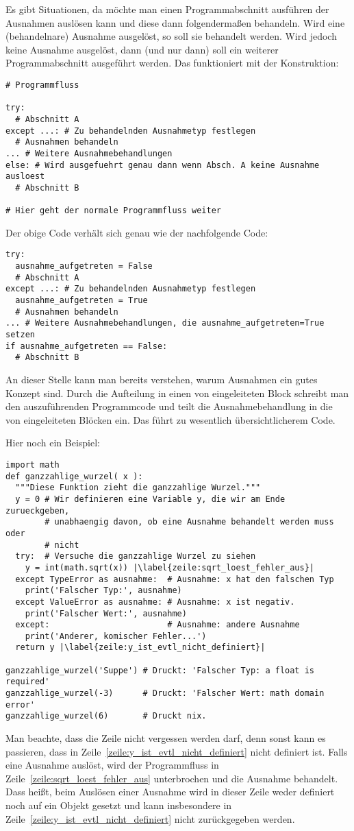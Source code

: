 Es gibt Situationen, da möchte man einen Programmabschnitt ausführen der Ausnahmen auslösen kann und diese dann folgendermaßen behandeln.
Wird eine (behandelnare) Ausnahme ausgelöst, so soll sie behandelt werden.
Wird jedoch keine Ausnahme ausgelöst, dann (und nur dann) soll ein weiterer Programmabschnitt ausgeführt werden.
Das funktioniert mit der  Konstruktion:
\begin{lstlisting}
# Programmfluss

try:
  # Abschnitt A
except ...: # Zu behandelnden Ausnahmetyp festlegen
  # Ausnahmen behandeln
... # Weitere Ausnahmebehandlungen
else: # Wird ausgefuehrt genau dann wenn Absch. A keine Ausnahme ausloest
  # Abschnitt B

# Hier geht der normale Programmfluss weiter
\end{lstlisting}
Der obige Code verhält sich genau wie der nachfolgende Code:
\begin{lstlisting}
try:
  ausnahme_aufgetreten = False
  # Abschnitt A
except ...: # Zu behandelnden Ausnahmetyp festlegen
  ausnahme_aufgetreten = True
  # Ausnahmen behandeln
... # Weitere Ausnahmebehandlungen, die ausnahme_aufgetreten=True setzen
if ausnahme_aufgetreten == False:
  # Abschnitt B
\end{lstlisting}

An dieser Stelle kann man bereits verstehen, warum Ausnahmen ein gutes Konzept sind.
Durch die Aufteilung in einen von  eingeleiteten Block schreibt man den auszuführenden Programmcode und
teilt die Ausnahmebehandlung in die von  eingeleiteten Blöcken ein.
Das führt zu wesentlich übersichtlicherem Code.

Hier noch ein Beispiel:
\begin{lstlisting}[escapechar=|]
import math
def ganzzahlige_wurzel( x ):
  """Diese Funktion zieht die ganzzahlige Wurzel."""
  y = 0 # Wir definieren eine Variable y, die wir am Ende zurueckgeben,
        # unabhaengig davon, ob eine Ausnahme behandelt werden muss oder
        # nicht
  try:  # Versuche die ganzzahlige Wurzel zu siehen
    y = int(math.sqrt(x)) |\label{zeile:sqrt_loest_fehler_aus}|
  except TypeError as ausnahme:  # Ausnahme: x hat den falschen Typ
    print('Falscher Typ:', ausnahme)
  except ValueError as ausnahme: # Ausnahme: x ist negativ.
    print('Falscher Wert:', ausnahme)
  except:                        # Ausnahme: andere Ausnahme
    print('Anderer, komischer Fehler...')
  return y |\label{zeile:y_ist_evtl_nicht_definiert}|

ganzzahlige_wurzel('Suppe') # Druckt: 'Falscher Typ: a float is required'
ganzzahlige_wurzel(-3)      # Druckt: 'Falscher Wert: math domain error'
ganzzahlige_wurzel(6)       # Druckt nix.
\end{lstlisting}
Man beachte, dass die Zeile  nicht vergessen werden darf, denn sonst kann es passieren, dass  in Zeile~\ref{zeile:y_ist_evtl_nicht_definiert} nicht definiert ist.
Falls  eine Ausnahme auslöst, wird der Programmfluss in Zeile~\ref{zeile:sqrt_loest_fehler_aus} unterbrochen und die Ausnahme behandelt.
Dass heißt, beim Auslösen einer Ausnahme wird  in dieser Zeile weder definiert noch auf ein Objekt gesetzt und kann insbesondere in Zeile~\ref{zeile:y_ist_evtl_nicht_definiert} nicht zurückgegeben werden.

